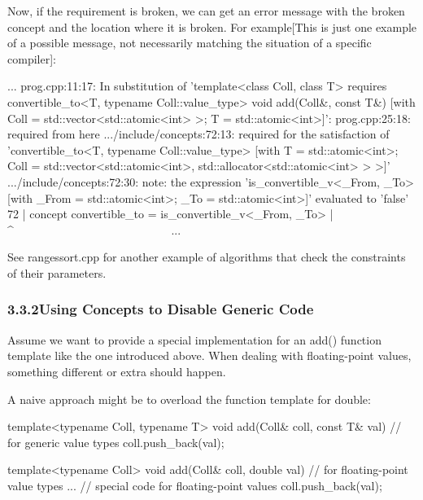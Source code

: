 Now, if the requirement is broken, we can get an error message with the broken concept and the location where it is broken. For example[This is just one example of a possible message, not necessarily matching the situation of a specific compiler]:

{\footnotesize
\begin{shell}
...
prog.cpp:11:17: In substitution of ’template<class Coll, class T>
                 requires convertible_to<T, typename Coll::value_type>
                 void add(Coll&, const T&)
                [with Coll = std::vector<std::atomic<int> >; T = std::atomic<int>]’:
prog.cpp:25:18: required from here
.../include/concepts:72:13: required for the satisfaction of
                 ’convertible_to<T, typename Coll::value_type>
                  [with T = std::atomic<int>;
                      Coll = std::vector<std::atomic<int>,
                                              std::allocator<std::atomic<int> > >]’
.../include/concepts:72:30: note: the expression ’is_convertible_v<_From, _To>
                      [with _From = std::atomic<int>; _To = std::atomic<int>]’
                      evaluated to ’false’
    72 | concept convertible_to = is_convertible_v<_From, _To>
        |                                    ^~~~~~~~~~~~~~~~~~~~~~~~~~~~
...
\end{shell}
}

See rangessort.cpp for another example of algorithms that check the constraints of their parameters.

\subsubsection*{ 3.3.2\hspace{0.2cm}Using Concepts to Disable Generic Code}

Assume we want to provide a special implementation for an add() function template like the one introduced above. When dealing with floating-point values, something different or extra should happen.

A naive approach might be to overload the function template for double:

\begin{cpp}
template<typename Coll, typename T>
void add(Coll& coll, const T& val) // for generic value types
{
	coll.push_back(val);
}

template<typename Coll>
void add(Coll& coll, double val) // for floating-point value types
{
	... // special code for floating-point values
	coll.push_back(val);
}
\end{cpp}

